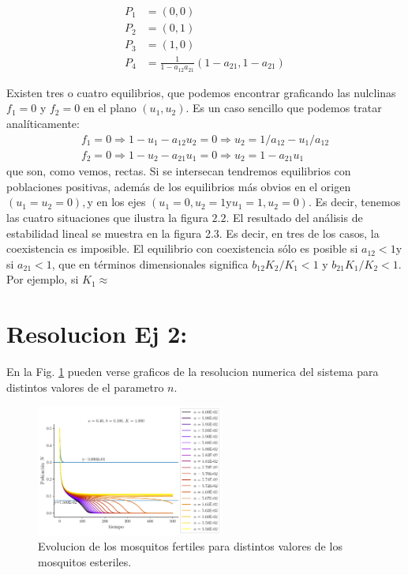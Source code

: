 \documentclass[twocolumn,aps,prl]{revtex4-1}
\begin{document}
$$
\begin{aligned}
    P_1 &= (0, 0) \\ 
    P_2 &= (0, 1) \\ 
    P_3 &= (1, 0) \\ 
    P_4 &= \frac{1}{1-a_{12} a_{21}}(1-a_{21}, 1-a_{21})
\end{aligned}
$$

Existen tres o cuatro equilibrios, que podemos encontrar graficando las nulclinas $f_{1}=0$ y $f_{2}=0$ en el plano $\left(u_{1}, u_{2}\right) .$ Es un caso sencillo que podemos tratar analíticamente:
$$
\begin{array}{l}
f_{1}=0 \Rightarrow 1-u_{1}-a_{12} u_{2}=0 \Rightarrow u_{2}=1 / a_{12}-u_{1} / a_{12} \\
f_{2}=0 \Rightarrow 1-u_{2}-a_{21} u_{1}=0 \Rightarrow u_{2}=1-a_{21} u_{1}
\end{array}
$$
que son, como vemos, rectas. Si se intersecan tendremos equilibrios con poblaciones positivas, además de los equilibrios más obvios en el origen $\left(u_{1}=u_{2}=0\right), \mathrm{y}$ en los ejes $\left(u_{1}=0, u_{2}=1 \mathrm{y} u_{1}=1, u_{2}=0\right) .$ Es decir,
tenemos las cuatro situaciones que ilustra la figura $2.2$. El resultado del análisis de estabilidad lineal se muestra en la figura 2.3.
Es decir, en tres de los casos, la coexistencia es imposible. El equilibrio con coexistencia sólo es posible si $a_{12}<1 \mathrm{y}$ si $a_{21}<1$, que en términos dimensionales significa $b_{12} K_{2} / K_{1}<1$ y $b_{21} K_{1} / K_{2}<1$. Por ejemplo, si $K_{1} \approx$

% 

\section{Resolucion Ej 2:}

En la Fig. \ref{fig:mosquitos} pueden verse graficos de la resolucion numerica del sistema para distintos valores de el parametro $n$.

\begin{figure}
    \centering
    \includegraphics[width=0.55\textwidth]{figuras/ex5.pdf}
    \caption{Evolucion de los mosquitos fertiles para distintos valores de los mosquitos esteriles.}
    \label{fig:mosquitos}
\end{figure}
\end{document}
